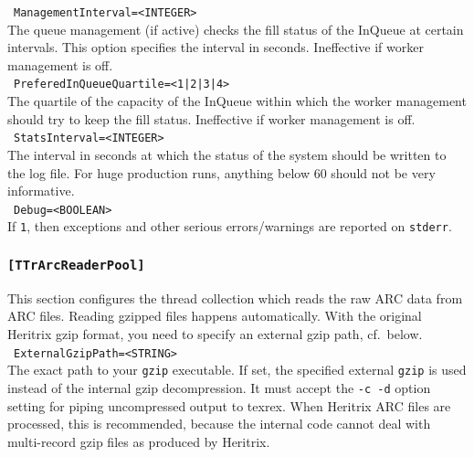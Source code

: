 \documentclass[12pt,a4paper]{article}
\begin{document}
\noindent\textbullet~\texttt{ManagementInterval=<INTEGER>}\\

The queue management (if active) checks the fill status of the InQueue at certain intervals.
This option specifies the interval in seconds.
Ineffective if worker management is off.\\

\noindent\textbullet~\texttt{PreferedInQueueQuartile=<1|2|3|4>}\\

The quartile of the capacity of the InQueue within which the worker management should try to keep the fill status.
Ineffective if worker management is off.\\

\noindent\textbullet~\texttt{StatsInterval=<INTEGER>}\\

The interval in seconds at which the status of the system should be written to the log file.
For huge production runs, anything below 60 should not be very informative.\\

\noindent\textbullet~\texttt{Debug=<BOOLEAN>}\\

If \texttt{1}, then exceptions and other serious errors\slash warnings are reported on \texttt{stderr}.

\subsubsection{\texttt{[TTrArcReaderPool]}}
\label{sec:arcreaderpool}

This section configures the thread collection which reads the raw ARC data from ARC files.
Reading gzipped files happens automatically.
With the original Heritrix gzip format, you need to specify an external gzip path, cf.\ below.\\

\noindent\textbullet~\texttt{ExternalGzipPath=<STRING>}\\

The exact path to your \texttt{gzip} executable.
If set, the specified external \texttt{gzip} is used instead of the internal gzip decompression.
It must accept the \texttt{-c -d} option setting for piping uncompressed output to texrex.
When Heritrix ARC files are processed, this is recommended, because the internal code cannot deal with multi-record gzip files as produced by Heritrix.\\
\end{document}
